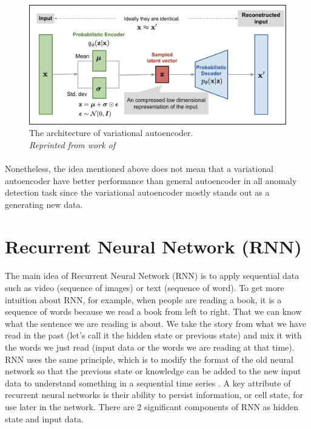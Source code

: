 \begin{figure}[H]
  \centering
  \caption[The architecture of variational autoencoder.]{The architecture of variational autoencoder. \\\hspace{\textwidth} \emph{Reprinted from work of \citeauthor{weng_2018} \citeyear{weng_2018}}}\label{fig:VAE}
  \includegraphics[scale = 0.15]{figures/VAE.jpg}  
\end{figure}

\paragraph{}
Nonetheless, the idea mentioned above does not mean that a variational autoencoder have better performance than general autoencoder in all anomaly detection task \cite{agmon_2021} since the variational autoencoder mostly stands out as a generating new data.


\section{Recurrent Neural Network (RNN)}
\paragraph{}
The main idea of Recurrent Neural Network (RNN) is to apply sequential data such as video (sequence of images) or text (sequence of word). To get more intuition about RNN, for example, when people are reading a book, it is a sequence of words because we read a book from left to right. That we can know what the sentence we are reading is about. We take the story from what we have read in the past (let's call it the hidden state or previous state) and mix it with the words we just read (input data or the words we are reading at that time). RNN uses the same principle, which is to modify the format of the old neural network so that the previous state or knowledge can be added to the new input data to understand something in a sequential time series \cite{donges_2019}. A key attribute of recurrent neural networks is their ability to persist information, or cell state, for use later in the network. There are 2 significant components of RNN as hidden state and input data.


